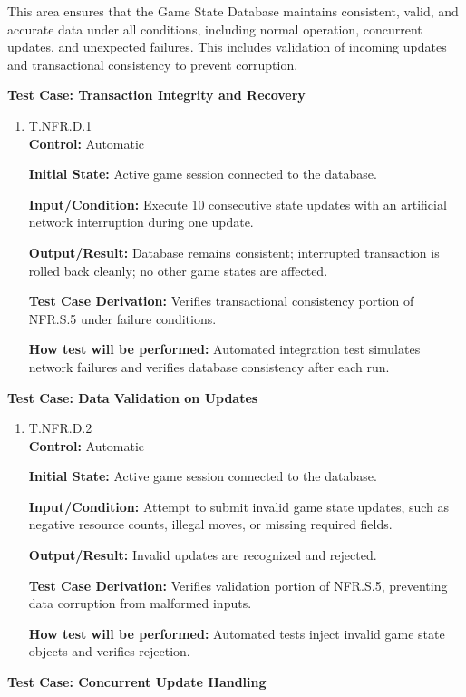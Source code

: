 \documentclass[12pt, titlepage]{article}
\begin{document}
This area ensures that the Game State Database maintains consistent, valid, and accurate data under all conditions, including normal operation, concurrent updates, and unexpected failures. This includes validation of incoming updates and transactional consistency to prevent corruption.

\textbf{Test Case: Transaction Integrity and Recovery}

\begin{enumerate}
\item T.NFR.D.1 \\
\textbf{Control:} Automatic

\textbf{Initial State:} Active game session connected to the database.

\textbf{Input/Condition:} Execute 10 consecutive state updates with an artificial network interruption during one update.

\textbf{Output/Result:} Database remains consistent; interrupted transaction is rolled back cleanly; no other game states are affected.

\textbf{Test Case Derivation:} Verifies transactional consistency portion of NFR.S.5 under failure conditions.

\textbf{How test will be performed:} Automated integration test simulates network failures and verifies database consistency after each run.
\end{enumerate}

\textbf{Test Case: Data Validation on Updates}

\begin{enumerate}
\item T.NFR.D.2 \\
\textbf{Control:} Automatic

\textbf{Initial State:} Active game session connected to the database.

\textbf{Input/Condition:} Attempt to submit invalid game state updates, such as negative resource counts, illegal moves, or missing required fields.

\textbf{Output/Result:} Invalid updates are recognized and rejected.

\textbf{Test Case Derivation:} Verifies validation portion of NFR.S.5, preventing data corruption from malformed inputs.

\textbf{How test will be performed:} Automated tests inject invalid game state objects and verifies rejection.
\end{enumerate}

\textbf{Test Case: Concurrent Update Handling}
\end{document}
